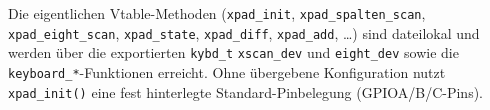 \noindent Die eigentlichen Vtable-Methoden (\verb|xpad_init|,
\verb|xpad_spalten_scan|, \verb|xpad_eight_scan|, \verb|xpad_state|,
\verb|xpad_diff|, \verb|xpad_add|, \dots) sind dateilokal und werden über die
exportierten \verb|kybd_t| \verb|xscan_dev| und \verb|eight_dev| sowie die
\verb|keyboard_*|-Funktionen erreicht. Ohne übergebene Konfiguration nutzt
\verb|xpad_init()| eine fest hinterlegte Standard-Pinbelegung
(GPIOA/B/C-Pins).
